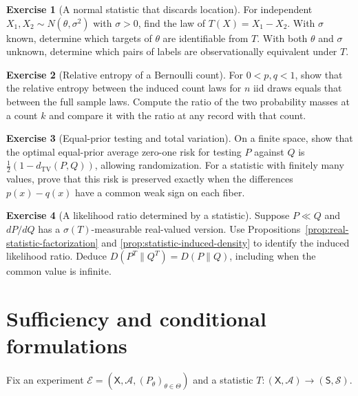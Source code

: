 \documentclass[11pt,oneside]{book}
\theoremstyle{definition}
\newtheorem{exercise}{Exercise}[section]
\theoremstyle{remark}
\begin{document}
\begin{exercise}[A normal statistic that discards location]
\label{exer:statistic-normal-difference}
For independent $X_1,X_2\sim N(\theta,\sigma^2)$ with
$\sigma>0$, find the law of $T(X)=X_1-X_2$. With $\sigma$
known, determine which targets of $\theta$ are identifiable
from $T$. With both $\theta$ and $\sigma$ unknown, determine
which pairs of labels are observationally equivalent under $T$.
\end{exercise}

\begin{exercise}[Relative entropy of a Bernoulli count]
\label{exer:statistic-bernoulli-count-preserves-kl}
For $0<p,q<1$, show that the relative entropy between the
induced count laws for $n$ iid draws equals that between the
full sample laws. Compute the ratio of the two probability
masses at a count $k$ and compare it with the ratio at any
record with that count.
\end{exercise}

\begin{exercise}[Equal-prior testing and total variation]
\label{exer:statistic-tv-testing-equality}
On a finite space, show that the optimal equal-prior average
zero-one risk for testing $P$ against $Q$ is
$\tfrac12(1-d_{\mathrm{TV}}(P,Q))$, allowing randomization.
For a statistic with finitely many values, prove that this
risk is preserved exactly when the differences $p(x)-q(x)$
have a common weak sign on each fiber.
\end{exercise}

\begin{exercise}[A likelihood ratio determined by a statistic]
\label{exer:statistic-ratio-preserves-kl}
Suppose $P\ll Q$ and $dP/dQ$ has a $\sigma(T)$-measurable
real-valued version. Use
Propositions~\ref{prop:real-statistic-factorization} and
\ref{prop:statistic-induced-density} to identify the induced
likelihood ratio. Deduce $D(P^T\|Q^T)=D(P\|Q)$, including
when the common value is infinite.
\end{exercise}



\clearpage
\section{Sufficiency and conditional formulations}
\label{sec:sufficiency-conditional}

Fix an experiment $\mathcal E=(\mathsf X,\mathcal A,
(P_\theta)_{\theta\in\Theta})$ and a statistic
$T:(\mathsf X,\mathcal A)\to(\mathsf S,\mathcal S)$.
\end{document}
